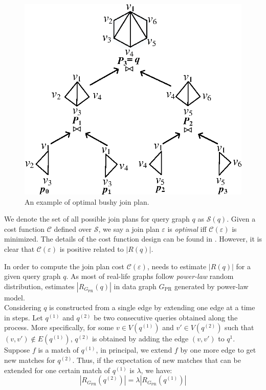 \begin{figure}[htb]
  \centering
  \includegraphics[scale=0.6]{figures/tree.eps}
  \caption{\small{An example of optimal bushy join plan.}}
  \label{fig:tree}
\end{figure}

We denote the set of all possible join plans for query graph $q$ as $\mathcal{S}(q)$. Given a cost function $\mathcal{C}$ defined over $\mathcal{S}$, we say a join plan $\varepsilon$ is \textit{optimal} iff $\mathcal{C}(\varepsilon)$ is minimized. The details of the cost function design can be found in \cite{Lai2016}. However, it is clear that $\mathcal{C}(\varepsilon)$ is positive related to $|R(q)|$.

 In order to compute the join plan cost  $\mathcal{C}(\varepsilon)$, \cliquejoin needs to estimate $|R(q)|$ for a given query graph $q$. As most of real-life graphs follow \textit{power-law} random distribution\cite{Chung2003}, \cliquejoin estimates $|R_{G_{\text{PR}}}(q)|$ in data graph $G_{\text{PR}}$ generated by power-law model.\\

Considering $q$ is constructed from a single edge by extending one edge at a time in steps. Let $q^{(1)}$ and $q^{(2)}$ be two consecutive queries obtained along the process. More specifically, for some $v\in V(q^{(1)})$ and $v'\in V(q^{(2)})$ such that  $(v,v')\not\in E(q^{(1)})$, $q^{(2)}$ is obtained by adding the edge $(v,v')$ to $q^{1}$. Suppose $f$ is a match of $q^{(1)}$, in principal, we extend $f$ by one more edge to get new matches for $q^{(2)}$. Thus, if the expectation of new matches that can be extended for one certain match of $q^{(1)}$ is $\lambda$, we have:
\begin{equation} \label{eq:r}
|R_{G_{\text{PR}}}(q^{(2)})|=\lambda |R_{G_{\text{PR}}}(q^{(1)})|
\end{equation}

